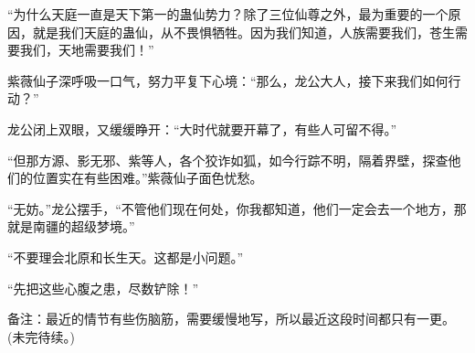 \begin{this_body}
“为什么天庭一直是天下第一的蛊仙势力？除了三位仙尊之外，最为重要的一个原因，就是我们天庭的蛊仙，从不畏惧牺牲。因为我们知道，人族需要我们，苍生需要我们，天地需要我们！”

紫薇仙子深呼吸一口气，努力平复下心境：“那么，龙公大人，接下来我们如何行动？”

龙公闭上双眼，又缓缓睁开：“大时代就要开幕了，有些人可留不得。”

“但那方源、影无邪、紫等人，各个狡诈如狐，如今行踪不明，隔着界壁，探查他们的位置实在有些困难。”紫薇仙子面色忧愁。

“无妨。”龙公摆手，“不管他们现在何处，你我都知道，他们一定会去一个地方，那就是南疆的超级梦境。”

“不要理会北原和长生天。这都是小问题。”

“先把这些心腹之患，尽数铲除！”

备注：最近的情节有些伤脑筋，需要缓慢地写，所以最近这段时间都只有一更。(未完待续。)

\end{this_body}

